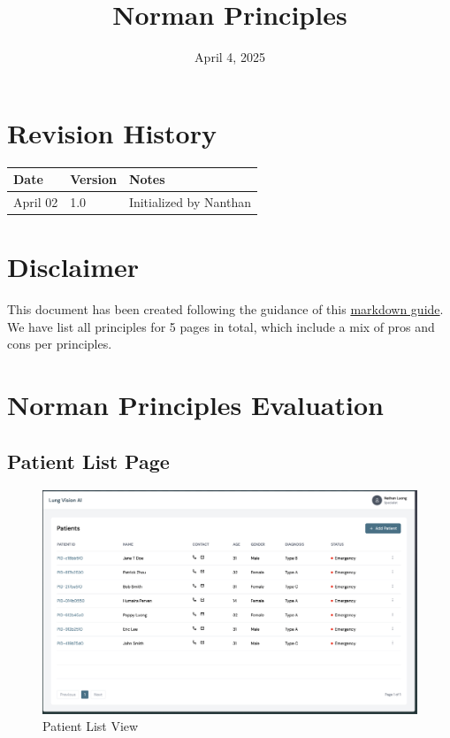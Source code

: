 \documentclass[12pt, titlepage]{article}
\begin{document}
\title{Norman Principles} 
\author{\authname}
\date{April 4, 2025}
	
\maketitle


\section{Revision History}
\begin{tabularx}{\textwidth}{p{3cm}p{2cm}X}
\toprule {\bf Date} & {\bf Version} & {\bf Notes}\\
\midrule
April 02 & 1.0 & Initialized by Nanthan\\

\bottomrule
\end{tabularx}


\newpage
\tableofcontents
\listoftables %
\listoffigures %

\section{Disclaimer}
This document has been created following the guidance of this \href{https://github.com/smiths/capTemplate/blob/main/docs/Extras/NormansPrinciples/Expectations.md}{markdown guide}. We have list all principles for 5 pages in total, which include a mix of pros and cons per principles.

\section{Norman Principles Evaluation}
\newpage



\subsection{Patient List Page}

  \begin{figure}[ht!] 
    \centering
    \includegraphics[scale=0.25]{../assets/patient_list.png}
    \caption{Patient List View}
    \label{fig:patient_list}
  \end{figure}
\end{document}
